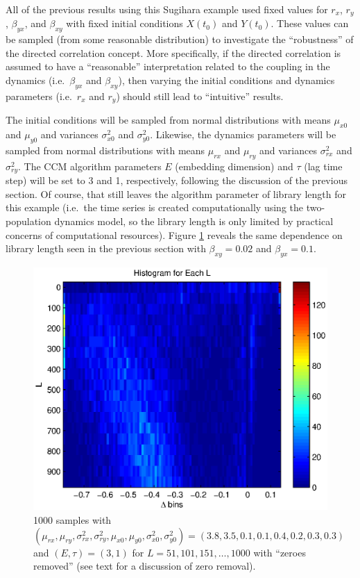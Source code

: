 \documentclass[a4paper,11pt]{article}
\begin{document}
All of the previous results using this Sugihara example used fixed values for $r_x$, $r_y$, $\beta_{yx}$, and $\beta_{xy}$ with fixed initial conditions $X(t_0)$ and $Y(t_0)$.  These values can be sampled (from some reasonable distribution) to investigate the ``robustness'' of the directed correlation concept.  More specifically, if the directed correlation is assumed to have a ``reasonable'' interpretation related to the coupling in the dynamics (i.e.\ $\beta_{yx}$ and $\beta_{xy}$), then varying the initial conditions and dynamics parameters (i.e.\ $r_x$ and $r_y$) should still lead to ``intuitive'' results.  

The initial conditions will be sampled from normal distributions with means $\mu_{x0}$ and $\mu_{y0}$ and variances $\sigma^2_{x0}$ and $\sigma^2_{y0}$.  Likewise, the dynamics parameters will be sampled from normal distributions with means $\mu_{rx}$ and $\mu_{ry}$ and variances $\sigma^2_{rx}$ and $\sigma^2_{ry}$.  The CCM algorithm parameters $E$ (embedding dimension) and $\tau$ (lag time step) will be set to 3 and 1, respectively, following the discussion of the previous section.  Of course, that still leaves the algorithm parameter of library length for this example (i.e.\ the time series is created computationally using the two-population dynamics model, so the library length is only limited by practical concerns of computational resources).  Figure \ref{fig:TwoPopDynvLL} reveals the same dependence on library length seen in the previous section with $\beta_{xy}=0.02$ and $\beta_{yx}=0.1$.
\begin{figure}[h!t]
\centering
\label{fig:TwoPopDynvLL}
\includegraphics[scale=0.55]{graphics/TwoPopDynvLL.eps}
\caption{1000 samples with $\left(\mu_{rx},\mu_{ry},\sigma^2_{rx},\sigma^2_{ry},\mu_{x0},\mu_{y0},\sigma^2_{x0},\sigma^2_{y0}\right) = \left(3.8,3.5,0.1,0.1,0.4,0.2,0.3,0.3\right)$ and $\left(E,\tau\right)=\left(3,1\right)$ for $L=51, 101, 151, \ldots, 1000$ with ``zeroes removed'' (see text for a discussion of zero removal).}
\end{figure}
\end{document}
